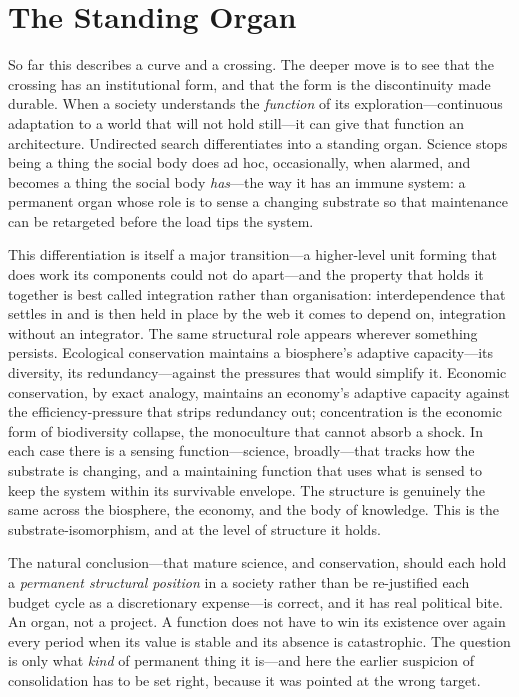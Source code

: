 \documentclass{article}
\begin{document}
\section*{The Standing Organ}

So far this describes a curve and a crossing. The deeper move is to see that the crossing has an institutional form, and that the form is the discontinuity made durable. When a society understands the \textit{function} of its exploration---continuous adaptation to a world that will not hold still---it can give that function an architecture. Undirected search differentiates into a standing organ. Science stops being a thing the social body does ad hoc, occasionally, when alarmed, and becomes a thing the social body \textit{has}---the way it has an immune system: a permanent organ whose role is to sense a changing substrate so that maintenance can be retargeted before the load tips the system.

This differentiation is itself a major transition---a higher-level unit forming that does work its components could not do apart---and the property that holds it together is best called integration rather than organisation: interdependence that settles in and is then held in place by the web it comes to depend on, integration without an integrator. The same structural role appears wherever something persists. Ecological conservation maintains a biosphere's adaptive capacity---its diversity, its redundancy---against the pressures that would simplify it. Economic conservation, by exact analogy, maintains an economy's adaptive capacity against the efficiency-pressure that strips redundancy out; concentration is the economic form of biodiversity collapse, the monoculture that cannot absorb a shock. In each case there is a sensing function---science, broadly---that tracks how the substrate is changing, and a maintaining function that uses what is sensed to keep the system within its survivable envelope. The structure is genuinely the same across the biosphere, the economy, and the body of knowledge. This is the substrate-isomorphism, and at the level of structure it holds.

The natural conclusion---that mature science, and conservation, should each hold a \textit{permanent structural position} in a society rather than be re-justified each budget cycle as a discretionary expense---is correct, and it has real political bite. An organ, not a project. A function does not have to win its existence over again every period when its value is stable and its absence is catastrophic. The question is only what \textit{kind} of permanent thing it is---and here the earlier suspicion of consolidation has to be set right, because it was pointed at the wrong target.
\end{document}
